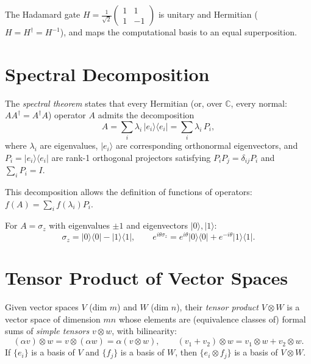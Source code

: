 \begin{example}
The Hadamard gate $H=\frac{1}{\sqrt{2}}\begin{pmatrix}1&1\\1&-1\end{pmatrix}$ is unitary and Hermitian ($H=H^\dagger=H^{-1}$), and maps the computational basis to an equal superposition.
\end{example}

\section{Spectral Decomposition}
\label{sec:spectral}

The \emph{spectral theorem} states that every Hermitian (or, over $\mathbb{C}$, every normal: $AA^\dagger=A^\dagger A$) operator $A$ admits the decomposition
\[
  A = \sum_i \lambda_i\, |e_i\rangle\langle e_i| = \sum_i \lambda_i\, P_i,
\]
where $\lambda_i$ are eigenvalues, $|e_i\rangle$ are corresponding orthonormal eigenvectors, and $P_i=|e_i\rangle\langle e_i|$ are rank-1 orthogonal projectors satisfying $P_iP_j=\delta_{ij}P_i$ and $\sum_i P_i=I$.

This decomposition allows the definition of functions of operators: $f(A)=\sum_i f(\lambda_i)P_i$.

\begin{example}
For $A=\sigma_z$ with eigenvalues $\pm1$ and eigenvectors $|0\rangle,|1\rangle$:
\[
  \sigma_z = |0\rangle\langle 0| - |1\rangle\langle 1|, \qquad e^{i\theta\sigma_z} = e^{i\theta}|0\rangle\langle 0| + e^{-i\theta}|1\rangle\langle 1|.
\]
\end{example}

\section{Tensor Product of Vector Spaces}

Given vector spaces $V$ (dim $m$) and $W$ (dim $n$), their \emph{tensor product} $V\otimes W$ is a vector space of dimension $mn$ whose elements are (equivalence classes of) formal sums of \emph{simple tensors} $v\otimes w$, with bilinearity:
\[
  (\alpha v)\otimes w = v\otimes(\alpha w) = \alpha(v\otimes w), \qquad (v_1+v_2)\otimes w = v_1\otimes w + v_2\otimes w.
\]
If $\{e_i\}$ is a basis of $V$ and $\{f_j\}$ is a basis of $W$, then $\{e_i\otimes f_j\}$ is a basis of $V\otimes W$.


